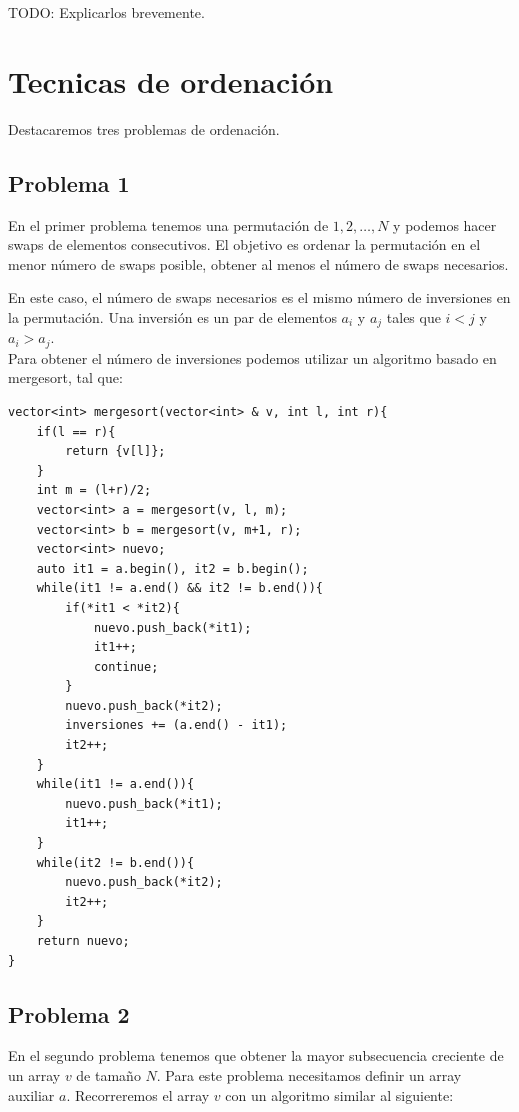 \documentclass[11 pt]{article}
\begin{document}
TODO: Explicarlos brevemente.

\vspace{25 px}
\section{Tecnicas de ordenación}


Destacaremos tres problemas de ordenación.

\subsection{Problema 1}
En el primer problema tenemos una permutación de $1,2,\dots ,N$ y podemos hacer swaps de elementos consecutivos.
El objetivo es ordenar la permutación en el menor número de swaps posible, obtener al menos el número de swaps necesarios.


En este caso, el número de swaps necesarios es el mismo número de inversiones en la permutación. Una
inversión es un par de elementos $a_i$ y $a_j$ tales que $i < j$ y $a_i > a_j$.\\
Para obtener el número de inversiones podemos utilizar un algoritmo basado en mergesort, tal que:

\begin{verbatim}
vector<int> mergesort(vector<int> & v, int l, int r){
    if(l == r){
        return {v[l]};
    }
    int m = (l+r)/2;
    vector<int> a = mergesort(v, l, m);
    vector<int> b = mergesort(v, m+1, r);
    vector<int> nuevo;
    auto it1 = a.begin(), it2 = b.begin();
    while(it1 != a.end() && it2 != b.end()){
        if(*it1 < *it2){
            nuevo.push_back(*it1);
            it1++;
            continue;
        }
        nuevo.push_back(*it2);
        inversiones += (a.end() - it1);
        it2++;
    }
    while(it1 != a.end()){
        nuevo.push_back(*it1);
        it1++;
    }
    while(it2 != b.end()){
        nuevo.push_back(*it2);
        it2++;
    }
    return nuevo;
}
\end{verbatim}

\subsection{Problema 2}
En el segundo problema tenemos que obtener la mayor subsecuencia creciente de un array $v$ de tamaño $N$.
Para este problema necesitamos definir un array auxiliar $a$. Recorreremos el array $v$ con un algoritmo
similar al siguiente:
\end{document}
